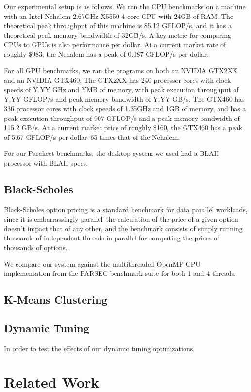 \documentclass[preprint]{sigplanconf}
\begin{document}
Our experimental setup is as follows.  We ran the CPU benchmarks on a machine
with an Intel Nehalem 2.67GHz X5550 4-core CPU with 24GB of RAM.  The
theoretical peak throughput of this machine is 85.12 GFLOP/s, and it has a
theoretical peak memory bandwidth of 32GB/s.  A key metric for comparing CPUs
to GPUs is also performance per dollar.  At a current market rate of roughly
\$983, the Nehalem has a peak of 0.087 GFLOP/s per dollar.

For all GPU benchmarks, we ran the programs on both an NVIDIA GTX2XX and an
NVIDIA GTX460.  The GTX2XX has 240 processor cores with clock speeds of
Y.YY GHz and YMB of memory, with peak execution throughput of Y.YY GFLOP/s and
peak memory bandwidth of Y.YY GB/s.  The GTX460 has 336 processor cores with
clock speeds of 1.35GHz and 1GB of memory, and has a peak execution throughput
of 907 GFLOP/s and a peak memory bandwidth of 115.2 GB/s.  At a current market
price of roughly \$160, the GTX460 has a peak of 5.67 GFLOP/s per dollar--65
times that of the Nehalem.

For our Parakeet benchmarks, the desktop system we used had a BLAH processor
with BLAH specs.

\subsection{Black-Scholes}
Black-Scholes option pricing \cite{Blac73} is a standard benchmark for data
parallel workloads, since it is embarrassingly parallel--the calculation of the
price of a given option doesn't impact that of any other, and the benchmark
consists of simply running thousands of independent threads in parallel for
computing the prices of thousands of options.

We compare our system against the multithreaded OpenMP CPU implementation
from the PARSEC \cite{Bien08} benchmark suite for both 1 and 4 threads.

\subsection{K-Means Clustering}


\subsection{Dynamic Tuning}
In order to test the effects of our dynamic tuning optimizations, 

\section{Related Work}
\label{RelatedWork}
\end{document}
